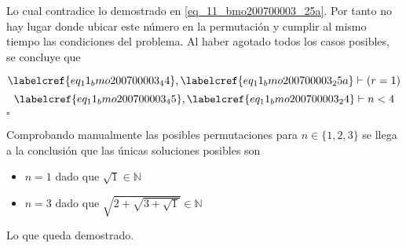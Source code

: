 Lo cual contradice lo demostrado en \cref{eq_11_bmo200700003_25a}. Por tanto no hay lugar donde ubicar este número en la permutación y cumplir al mismo tiempo las condiciones del problema. Al haber agotado todos los casos posibles, se concluye que 

\begin{equation} \label{eq_11_bmo200700003_45}
	\labelcref{eq_11_bmo200700003_44}, \labelcref{eq_11_bmo200700003_25a} \vdash (r=1)
\end{equation}
\begin{equation} \label{eq_11_bmo200700003_46}
	\labelcref{eq_11_bmo200700003_45}, \labelcref{eq_11_bmo200700003_24} \vdash n<4
\end{equation}
\hfill $\square$

Comprobando manualmente las posibles permutaciones para $n \in \{1,2,3\}$ se llega a la conclusión que las únicas soluciones posibles son 

\begin{itemize}
	\item{$n=1$ dado que $\sqrt{1} \in \mathbb{N}$}
	\item{$n=3$ dado que $\sqrt{2 + \sqrt{3 + \sqrt{1}}} \in \mathbb{N}$}
\end{itemize}

\vspace{1cm}
Lo que queda demostrado. \\\\\\
